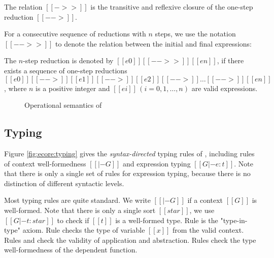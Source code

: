 \begin{dfn}
    The relation $[[->>]]$ is the transitive and reflexive closure of
    the one-step reduction $[[-->]]$.
\end{dfn}

For a consecutive sequence of reductions
with $n$ steps, we use the notation $[[-->>]]$ to denote the relation
between the initial and final expressions:

\begin{dfn}
    The $n$-step reduction is denoted by $[[e0]] [[-->>]] [[en]]$, if
    there exists a sequence of one-step reductions $[[e0]] [[-->]]
    [[e1]] [[-->]] [[e2]] [[-->]] \dots [[-->]] [[en]]$, where $n$ is
    a positive integer and $[[ei]]\,(i=0,1,\dots,n)$ are valid
    expressions.
\end{dfn}

\begin{figure}
    \ottdefnstep{}
    \caption{Operational semantics of \ecore}
    \label{fig:ecore:opsem}
\end{figure}

\subsection{Typing}\label{sec:ecore:type}

Figure \ref{fig:ecore:typing} gives the \emph{syntax-directed} typing
rules of \ecore, including rules of context well-formedness $[[|- G]]$
and expression typing $[[G |- e : t]]$. Note that there is only a
single set of rules for expression typing, because there is no
distinction of different syntactic levels.

Most typing rules are quite standard. We write $[[|- G]]$ if a context
$[[G]]$ is well-formed. Note that there is only a single sort
$[[star]]$, we use $[[G |- t : star]]$ to check if $[[t]]$ is a
well-formed type. Rule  is the "type-in-type"
axiom. Rule  checks the type of variable $[[x]]$ from
the valid context. Rules  and  check
the validity of application and abstraction. Rules 
check the type well-formedness of the dependent function.

